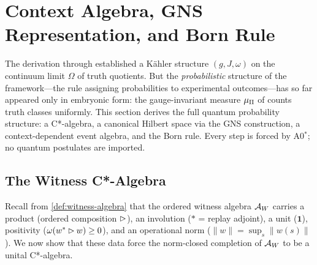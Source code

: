 
\section{Context Algebra, GNS Representation, and Born Rule}
\label{sec:context-born}

The derivation through  established a K\"{a}hler structure
$(g, J, \omega)$ on the continuum limit $\Omega$ of truth quotients.  But the
\emph{probabilistic} structure of the framework---the rule assigning
probabilities to experimental outcomes---has so far appeared only in
embryonic form: the gauge-invariant measure $\mu_\Pi$ of  counts
truth classes uniformly.  This section derives the full quantum probability
structure: a C*-algebra, a canonical Hilbert space via the GNS construction,
a context-dependent event algebra, and the Born rule.  Every step is forced
by A0$^*$; no quantum postulates are imported.

\subsection{The Witness C*-Algebra}
\label{sec:context-born:cstar}

Recall from \cref{def:witness-algebra} that the ordered witness algebra
$\mathcal{A}_W$ carries a product (ordered composition $\mathbin{\vartriangleright}$), an
involution ($*$ = replay adjoint), a unit ($\mathbf{1}$), positivity
($\omega(w^* \mathbin{\vartriangleright} w) \geq 0$), and an operational norm
($\|w\| = \sup_s \|w(s)\|$).  We now show that these data force the
norm-closed completion of $\mathcal{A}_W$ to be a unital C*-algebra.

